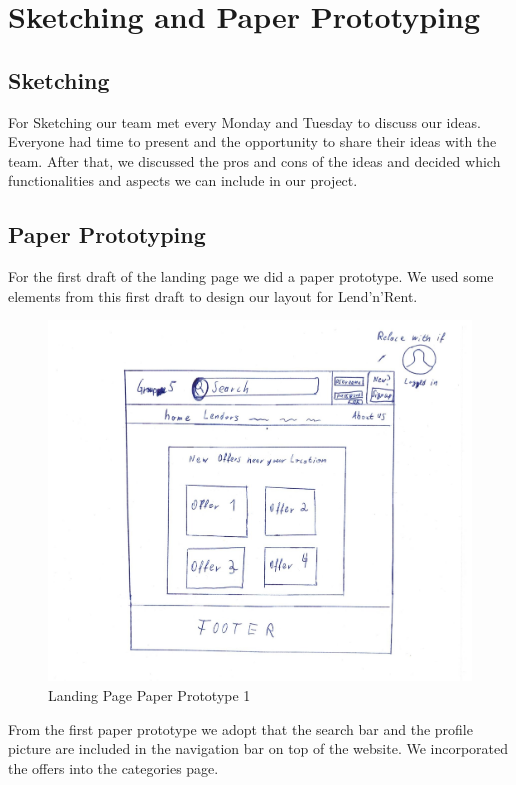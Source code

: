 \section{Sketching and Paper Prototyping}

    \subsection{Sketching}
        For Sketching our team met every Monday and Tuesday to discuss our ideas. Everyone had time to present and the opportunity to share their ideas with the team. After that, we discussed the pros and cons of the ideas and decided which functionalities and aspects we can include in our project.
        
    \subsection{Paper Prototyping}
        For the first draft of the landing page we did a paper prototype. We used some elements from this first draft to design our layout for Lend'n'Rent.
        
        	\begin{figure}[H]
				\centering
				\includegraphics[width=\linewidth]{abb/6_Sketching and Paper Prototyping/Homepage1.png}
				\caption{Landing Page Paper Prototype 1}
				\label{fig:Homepage1}
			\end{figure}
			
			\noindent
			From the first paper prototype we adopt that the search bar and the profile picture are included in the navigation bar on top of the website. We incorporated the offers into the categories page. 
			
